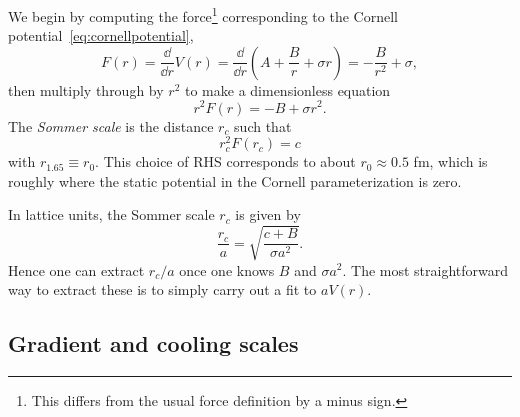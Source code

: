 We begin by computing the force\footnote{This differs from the usual
force definition by a minus sign.} corresponding to the Cornell
potential~\eqref{eq:cornellpotential},
\begin{equation}
  F(r)=\frac{\dd}{\dd r}V(r)
      =\frac{\dd}{\dd r}\left(A+\frac{B}{r}+\sigma r\right)
      =-\frac{B}{r^2}+\sigma,
\end{equation}
then multiply through by $r^2$ to make a dimensionless equation
\begin{equation}
  r^2F(r)=-B+\sigma r^2.
\end{equation}
The {\it Sommer scale} is the distance $r_c$ such that
\begin{equation}
  r_c^2F(r_c)=c
\end{equation}
with $r_{1.65}\equiv r_0$. This choice of RHS corresponds to
about $r_0\approx 0.5$ fm, which is roughly where the static potential in the
Cornell parameterization is zero.

In lattice units, the Sommer scale $r_c$ is given by
\begin{equation}
  \frac{r_c}{a}=\sqrt{\frac{c+B}{\sigma a^2}}.
\end{equation}
Hence one can extract $r_c/a$ once one knows $B$ and $\sigma a^2$. The most
straightforward way to extract these is
to simply carry out a fit to $aV(r)$.

\subsection{Gradient and cooling scales}


